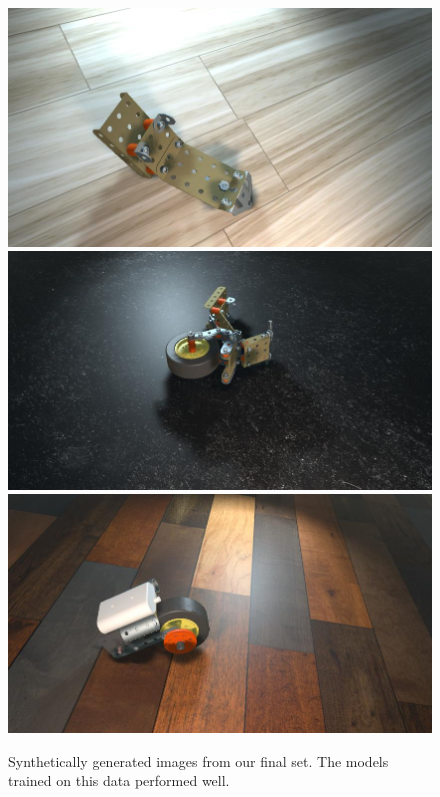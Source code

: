 \begin{figure}
  \includegraphics[width=0.5\columnwidth]{figures/synthetic/floor1.jpg}
  \includegraphics[width=0.5\columnwidth]{figures/synthetic/floor2.jpg}
  \includegraphics[width=0.5\columnwidth]{figures/synthetic/floor3.jpg}
  \caption{
    Synthetically generated images from our final set. The models trained on
    this data performed well.
  }\label{fig:good_data}
\end{figure}

